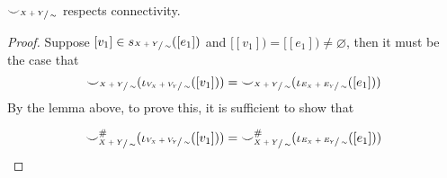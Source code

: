 \begin{lemma}
\label{lemma:consistency_respect}
${\smile}_{\sfrac{X+Y}{\sim}}$ respects connectivity.
\end{lemma}
\begin{proof}
    Suppose $[v_1] \in s_{\sfrac{X+Y}{\sim}}([e_1])$ and $[[v_1]) = [[e_1]) \not = \varnothing$, then it must be the case that 
    \[
    {\smile}_{\sfrac{X+Y}{\sim}}(\iota_{\sfrac{V_{X} + V_{Y}}{\sim}}([v_1])) = {\smile}_{\sfrac{X+Y}{\sim}}(\iota_{\sfrac{E_{X} + E_{Y}}{\sim}}([e_1]))
    \]
    By the lemma above, to prove this, it is sufficient to show that

    \[
    {\smile}_{\sfrac{X+Y}{\sim}}^{{\#}}(\iota_{\sfrac{V_{X} + V_{Y}}{\sim}}([v_1])) = {\smile}_{\sfrac{X+Y}{\sim}}^{{\#}}(\iota_{\sfrac{E_{X} + E_{Y}}{\sim}}([e_1]))
    \]


\end{proof}
